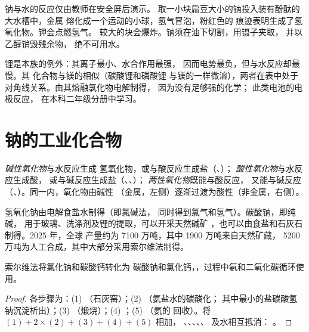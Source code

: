 \begin{inthelab}[演示，而非实验]
钠与水的反应仅由教师在安全屏后演示。
取一小块扁豆大小的钠投入装有酚酞的大水槽中，金属
熔化成一个运动的小球，氢气冒泡，粉红色的
痕迹表明生成了氢氧化物。钾会点燃氢气。
较大的块会爆炸。钠须在油下切割，用镊子夹取，
并以乙醇销毁残余物，
绝不可用水。
\end{inthelab}

锂是本族的例外：其离子最小、水合作用最强，
因而电势最负，但与水反应却最慢。其
化合物与镁的相似（碳酸锂和磷酸锂
与镁的一样微溶），两者在表中处于
对角线关系。由其熔融氯化物电解制得，
因为没有足够强的化学；
此类电池的电极反应，
在本科二年级分册中学习。

\section{钠的工业化合物}

\begin{definition}[氧化物的性质]\label{def:b1:s-block:oxide-character}
\emph{碱性氧化物}与水反应生成
氢氧化物，或与酸反应生成盐（、）；
\emph{酸性氧化物}与水反应生成酸，
或与碱反应生成盐（、、）；
\emph{两性氧化物}既能与酸反应，
又能与碱反应（、）。同一内，氧化物由碱性
（金属，左侧）逐渐过渡为酸性（非金属，右侧）。
\end{definition}

氢氧化钠由电解食盐水制得（即氯碱法，
同时得到氯气和氢气）。碳酸钠，即纯碱，
用于玻璃、洗涤剂及锂的提取，可以开采天然碱矿
，也可以由食盐和石灰石制得。2025 年，全球
产量约为 7100 万吨，其中 1900 万吨来自天然矿藏，
5200 万吨为人工合成，其中大部分采用索尔维法制得。

\begin{proposition}[索尔维法]\label{prop:b1:s-block:solvay}
索尔维法将氯化钠和碳酸钙转化为
碳酸钠和氯化钙，，过程中氨和二氧化碳循环使用。
\end{proposition}

\begin{proof}
各步骤为：(1) （石灰窑）；(2) （氨盐水的碳酸化；
其中最小的盐碳酸氢钠沉淀析出）；(3)
（煅烧）；(4) ；(5) （氨的
回收）。将 $(1) + 2\times(2) + (3) + (4) + (5)$ 相加，
、、、、、 及水相互抵消：
。
\end{proof}

